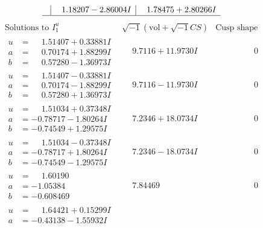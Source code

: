 \documentclass[1p]{elsarticle_modified}
\theoremstyle{definition}
\newcommand{\I}{\sqrt{-1}}
\begin{document}
$$\begin{array}{c|c|c}
 & \phantom{-}1.18207 - 2.86004 I & \phantom{-}1.78475 + 2.80266 I\\
 \hline 
 \end{array}$$\newpage$$\begin{array}{c|c|c}  
\text{Solutions to }I^u_{1}& \I (\text{vol} + \sqrt{-1}CS) & \text{Cusp shape}\\
 \hline 
\begin{aligned}
u &= \phantom{-}1.51407 + 0.33881 I \\
a &= \phantom{-}0.70174 + 1.88299 I \\
b &= \phantom{-}0.57280 - 1.36973 I\end{aligned}
 & \phantom{-}9.7116 + 11.9730 I & \phantom{-0.000000 } 0 \\ \hline\begin{aligned}
u &= \phantom{-}1.51407 - 0.33881 I \\
a &= \phantom{-}0.70174 - 1.88299 I \\
b &= \phantom{-}0.57280 + 1.36973 I\end{aligned}
 & \phantom{-}9.7116 - 11.9730 I & \phantom{-0.000000 } 0 \\ \hline\begin{aligned}
u &= \phantom{-}1.51034 + 0.37348 I \\
a &= -0.78717 - 1.80264 I \\
b &= -0.74549 + 1.29575 I\end{aligned}
 & \phantom{-}7.2346 + 18.0734 I & \phantom{-0.000000 } 0 \\ \hline\begin{aligned}
u &= \phantom{-}1.51034 - 0.37348 I \\
a &= -0.78717 + 1.80264 I \\
b &= -0.74549 - 1.29575 I\end{aligned}
 & \phantom{-}7.2346 - 18.0734 I & \phantom{-0.000000 } 0 \\ \hline\begin{aligned}
u &= \phantom{-}1.60190\phantom{ +0.000000I} \\
a &= -1.05384\phantom{ +0.000000I} \\
b &= -0.608469\phantom{ +0.000000I}\end{aligned}
 & \phantom{-}7.84469\phantom{ +0.000000I} & \phantom{-0.000000 } 0 \\ \hline\begin{aligned}
u &= \phantom{-}1.64421 + 0.15299 I \\
a &= -0.43138 - 1.55932 I \\

\end{aligned}
\end{array}$$
\end{document}
